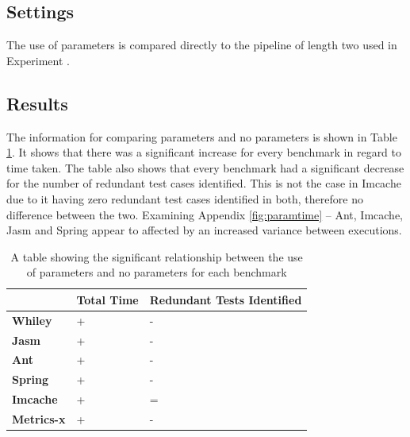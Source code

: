 \subsection{Settings}
The use of parameters is compared directly to the pipeline of length two used in Experiment .

\subsection{Results}
The information for comparing parameters and no parameters is shown in Table \ref{parametersig}. It shows that there was a significant increase for every benchmark in regard to time taken. The table also shows that every benchmark had a significant decrease for the number of redundant test cases identified. This is not the case in Imcache due to it having zero redundant test cases identified in both, therefore no difference between the two. Examining Appendix \ref{fig:paramtime} -- Ant, Imcache, Jasm and Spring appear to affected by an increased variance between executions.

\begin{table}[h]
\centering
\begin{tabular}{|l|l|l|}
\hline
{\bf }          & {\bf Total Time} & {\bf Redundant Tests Identified} \\ \hline
{\bf Whiley}    & +                & -                           \\ \hline
{\bf Jasm}      & +               & -                          \\ \hline
{\bf Ant}       & +                & -                           \\ \hline
{\bf Spring}    & +                & -                           \\ \hline
{\bf Imcache}   & +                & =                           \\ \hline
{\bf Metrics-x} & +                & -                           \\ \hline
\end{tabular}
\caption{A table showing the significant relationship between the use of parameters and no parameters for each benchmark}
\label{parametersig}
\end{table}

